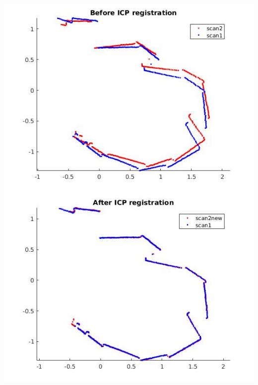\documentclass[a4paper,fleqn,11pt]{article}
\theoremstyle{mytheor}
\begin{document}
\section{}
\begin{center}
\includegraphics[scale = 0.75]{../images/q4before.jpg} \\
\includegraphics[scale = 0.75]{../images/q4after.jpg}
\end{center}

\section{}
\end{document}
